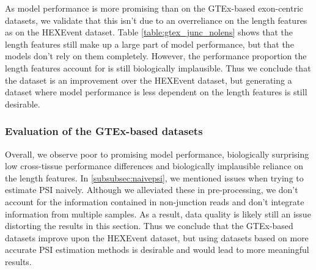 As model performance is more promising than on the GTEx-based exon-centric datasets, we validate that this isn't due to an overreliance on the length features as on the HEXEvent dataset. Table \ref{table:gtex_junc_nolens} shows that the length features still make up a large part of model performance, but that the models don't rely on them completely. However, the performance proportion the length features account for is still biologically implausible. %
Thus we conclude that the dataset is an improvement over the HEXEvent dataset, but generating a dataset where model performance is less dependent on the length features is still desirable. 




\subsubsection{Evaluation of the GTEx-based datasets}
Overall, we observe poor to promising model performance, biologically surprising low cross-tissue performance differences and biologically implausible reliance on the length features. 
In \ref{subsubsec:naivepsi}, we mentioned issues when trying to estimate PSI naively. Although we alleviated these in pre-processing, we don't account for the information contained in non-junction reads and don't integrate information from multiple samples. As a result, data quality is likely still an issue distorting the results in this section. 
Thus we conclude that the GTEx-based datasets improve upon the HEXEvent dataset, but using datasets based on more accurate PSI estimation methods is desirable and would lead to more meaningful results. %


